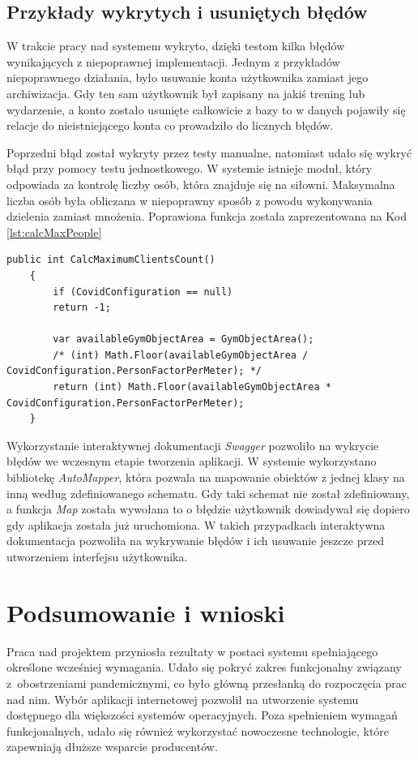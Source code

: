 \documentclass[a4paper,twoside,12pt]{book}
\begin{document}
\section{Przykłady wykrytych i usuniętych błędów}
W trakcie pracy nad systemem wykryto, dzięki testom kilka błędów wynikających z niepoprawnej implementacji. Jednym z przykładów niepoprawnego działania, było usuwanie konta użytkownika zamiast jego archiwizacja. Gdy ten sam użytkownik był zapisany na jakiś trening lub wydarzenie, a konto zostało usunięte całkowicie z bazy to w danych pojawiły się relacje do nieistniejącego konta co prowadziło do licznych błędów.

Poprzedni błąd został wykryty przez testy manualne, natomiast udało się wykryć błąd przy pomocy testu jednostkowego. W systemie istnieje moduł, który odpowiada za kontrolę liczby osób, która znajduje się na siłowni. Maksymalna liczba osób była obliczana w niepoprawny sposób z powodu wykonywania dzielenia zamiast mnożenia. Poprawiona funkcja została zaprezentowana na Kod \ref{lst:calcMaxPeople}
\begin{lstlisting}[caption={Metoda licząca jaka jest maksymalna liczba osób, która znajduje się w~jednej chwili w~obiekcie siłowni}, label={lst:calcMaxPeople}]
	public int CalcMaximumClientsCount()
	{
		if (CovidConfiguration == null)
		return -1;
		
		var availableGymObjectArea = GymObjectArea();
		/* (int) Math.Floor(availableGymObjectArea / CovidConfiguration.PersonFactorPerMeter); */
		return (int) Math.Floor(availableGymObjectArea * CovidConfiguration.PersonFactorPerMeter);
	}
\end{lstlisting}

Wykorzystanie interaktywnej dokumentacji \textit{Swagger} pozwoliło na wykrycie błędów we wczesnym etapie tworzenia aplikacji. W systemie wykorzystano bibliotekę \textit{AutoMapper}, która pozwala na mapowanie obiektów z jednej klasy na inną według zdefiniowanego schematu. Gdy taki schemat nie został zdefiniowany, a funkcja \textit{Map} została wywołana to o błędzie użytkownik dowiadywał się dopiero gdy aplikacja została już uruchomiona. W takich przypadkach interaktywna dokumentacja pozwoliła na wykrywanie błędów i ich usuwanie jeszcze przed utworzeniem interfejsu użytkownika.

\chapter{Podsumowanie i wnioski}
\label{chap:summary}
Praca nad projektem przyniosła rezultaty w postaci systemu spełniającego określone wcześniej wymagania. Udało się pokryć zakres funkcjonalny związany z~obostrzeniami pandemicznymi, co było główną przesłanką do rozpoczęcia prac nad nim. Wybór aplikacji internetowej pozwolił na utworzenie systemu dostępnego dla większości systemów operacyjnych. Poza spełnieniem wymagań funkcjonalnych, udało się również wykorzystać nowoczesne technologie, które zapewniają dłuższe wsparcie producentów.
\end{document}

